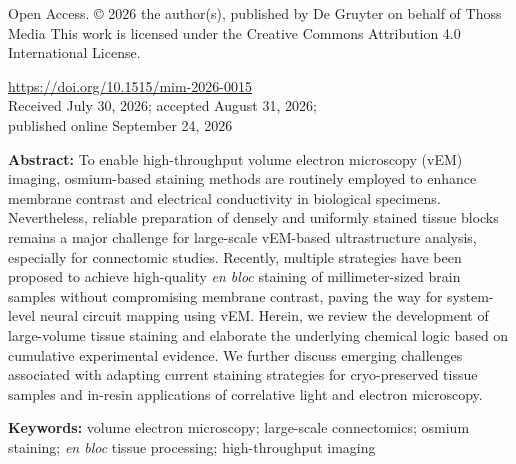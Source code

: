 \documentclass{article}
\begin{document}
{\small\noindent Open Access. © 2026 the author(s), published by De Gruyter on behalf of Thoss Media This work is licensed under the Creative Commons Attribution 4.0 International License.\par}

\medskip
{\small\noindent \url{https://doi.org/10.1515/mim-2026-0015}\\
Received July 30, 2026; accepted August 31, 2026;\\
published online September 24, 2026\par}

\medskip
\noindent \textbf{Abstract:} To enable high-throughput volume electron microscopy (vEM) imaging, osmium-based staining methods are routinely employed to enhance membrane contrast and electrical conductivity in biological specimens. Nevertheless, reliable preparation of densely and uniformly stained tissue blocks remains a major challenge for large-scale vEM-based ultrastructure analysis, especially for connectomic studies. Recently, multiple strategies have been proposed to achieve high-quality \emph{en bloc} staining of millimeter-sized brain samples without compromising membrane contrast, paving the way for system-level neural circuit mapping using vEM. Herein, we review the development of large-volume tissue staining and elaborate the underlying chemical logic based on cumulative experimental evidence. We further discuss emerging challenges associated with adapting current staining strategies for cryo-preserved tissue samples and in-resin applications of correlative light and electron microscopy.

\medskip
\noindent \textbf{Keywords:} volume electron microscopy; large-scale connectomics; osmium staining; \emph{en bloc} tissue processing; high-throughput imaging
\end{document}
